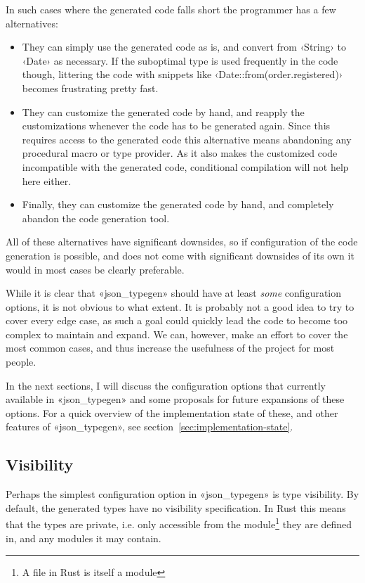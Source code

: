 In such cases where the generated code falls short the programmer has a few alternatives:

\begin{itemize}
  \item They can simply use the generated code as is, and convert from ‹String› to ‹Date› as necessary. If the suboptimal type is used frequently in the code though, littering the code with snippets like ‹Date::from(order.registered)› becomes frustrating pretty fast.
  \item They can customize the generated code by hand, and reapply the customizations whenever the code has to be generated again. Since this requires access to the generated code this alternative means abandoning any procedural macro or type provider. As it also makes the customized code incompatible with the generated code, conditional compilation will not help here either.
  \item Finally, they can customize the generated code by hand, and completely abandon the code generation tool.
\end{itemize}

All of these alternatives have significant downsides, so if configuration of the code generation is possible, and does not come with significant downsides of its own it would in most cases be clearly preferable.

While it is clear that «json_typegen» should have at least \emph{some} configuration options, it is not obvious to what extent. It is probably not a good idea to try to cover every edge case, as such a goal could quickly lead the code to become too complex to maintain and expand. We can, however, make an effort to cover the most common cases, and thus increase the usefulness of the project for most people.

In the next sections, I will discuss the configuration options that currently available in «json_typegen» and some proposals for future expansions of these options. For a quick overview of the implementation state of these, and other features of «json_typegen», see section~\ref{sec:implementation-state}.

\subsection{Visibility}
\label{sec:visibility}

Perhaps the simplest configuration option in «json_typegen» is type visibility. By default, the generated types have no visibility specification. In Rust this means that the types are private, i.e. only accessible from the module\footnote{A file in Rust is itself a module} they are defined in, and any modules it may contain.

